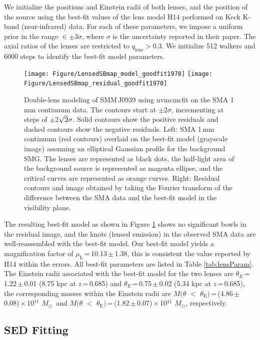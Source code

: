 \documentclass[twocolumn,apj,numberedappendix]{emulateapj}
\newcommand{\Msun}{\mbox{$M_{\odot}$}}
\begin{document}
We initialize the positions and Einstein radii of both lenses, and the position of the source using the
best-fit values of the lens model H14 performed on Keck K-band (near-infrared) data. For each of
these parameters, we impose a uniform prior in the range $\in\pm$3$\sigma$, where $\sigma$ is the uncertainty
reported in their paper. The axial ratios of the lenses are restricted to $q_\textrm{lens} > 0.3$. We initialize 512
walkers and 6000 steps to identify the best-fit model parameters.
\begin{figure}[!tbpH]
\centering
\texttt{[image: Figure/LensedSBmap\_model\_goodfit1970]}
\texttt{[image: Figure/LensedSBmap\_residual\_goodfit1970]}
\caption{Double-lens modeling of SMM\,J0939 using {\sc uvmcmcfit} on the SMA 1\,mm continuum data.
The contours start at $\pm$2$\sigma$, incrementing at
steps of $\pm$2$\sqrt{\rm 2}\sigma$. Solid contours show the positive residuals and dashed contours
show the negative residuals. 
Left: SMA 1\,mm continuum (red contours) overlaid on the best-fit model (grayscale image) assuming an elliptical Gaussian profile for the background SMG. The lenses are represented as black dots, the half-light area of the background source is represented as magenta ellipse, and the critical curves are represented as orange curves. 
Right: Residual contours and image obtained by taking the Fourier transform of the difference between the SMA data and the best-fit model in the visibility plane. \label{fig:lens}}
\end{figure}

The resulting best-fit model as shown in Figure\,\,\ref{fig:lens} shows no significant bowls in the residual
image, and the knots (lensed emission) in the observed SMA data are well-reassembled with the best-fit model.
Our best-fit model yields a magnification
factor of $\mu_\textrm{L}$\,=\,10.13\,$\pm$\,1.38, this is consistent the value reported by H14 within the errors. All best-fit
parameters are listed in Table \ref{tab:lensParam}. The Einstein radii associated with the best-fit model for the two lenses are $\theta_{E}$\,=\,1.22\,$\pm$\,0.01 (8.75 kpc at $z$\,=\,0.685) and $\theta_{E}$\,=\,0.75\,$\pm$\,0.02 (5.34 kpc at $z$\,=\,0.685),
the corresponding masses within the Einstein radii are $M(\theta$\,\,$<$\,\,$\theta_\textrm{E})$\,=\,(4.86\,$\pm$\,0.08)\,$\times$\,10$^{11}$\,\,\Msun\ and $M(\theta$\,\,$<$\,\,$\theta_\textrm{E})$\,=\,(1.82\,$\pm$\,0.07)\,$\times$\,10$^{11}$\,\,\Msun, respectively. 


\subsection{SED Fitting} \label{sec:SED}
\end{document}
